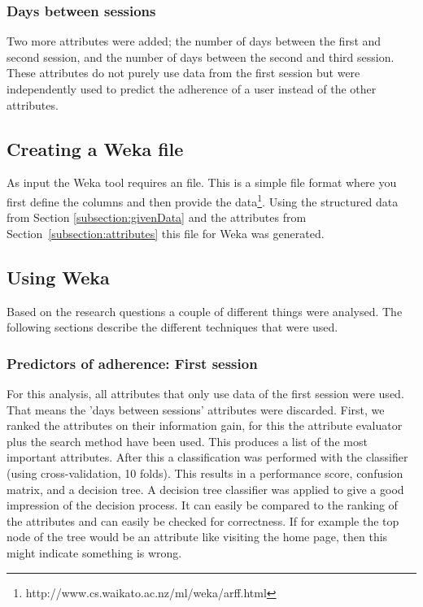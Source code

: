 \subsubsection{Days between sessions}
Two more attributes were added; the number of days between the first and second session, and the number of days between the second and third session. These attributes do not purely use data from the first session but were independently used to predict the adherence of a user instead of the other attributes.

\subsection{Creating a Weka file}
As input the Weka tool requires an  file. This is a simple file format where you first define the columns and then provide the data\footnote{http://www.cs.waikato.ac.nz/ml/weka/arff.html}. Using the structured data from Section \ref{subsection:givenData} and the attributes from Section~\ref{subsection:attributes} this file for Weka was generated.

\subsection{Using Weka} \label{subsection:usingWeka}
Based on the research questions a couple of different things were analysed. The following sections describe the different techniques that were used.

\subsubsection{Predictors of adherence: First session}
For this analysis, all attributes that only use data of the first session were used. That means the 'days between sessions' attributes were discarded. First, we ranked the attributes on their information gain, for this the  attribute evaluator plus the  search method have been used. This produces a list of the most important attributes. After this a classification was performed with the  classifier (using cross-validation, 10 folds). This results in a performance score, confusion matrix, and a decision tree. A decision tree classifier was applied to give a good impression of the decision process. It can easily be compared to the ranking of the attributes and can easily be checked for correctness. If for example the top node of the tree would be an attribute like visiting the home page, then this might indicate something is wrong.

